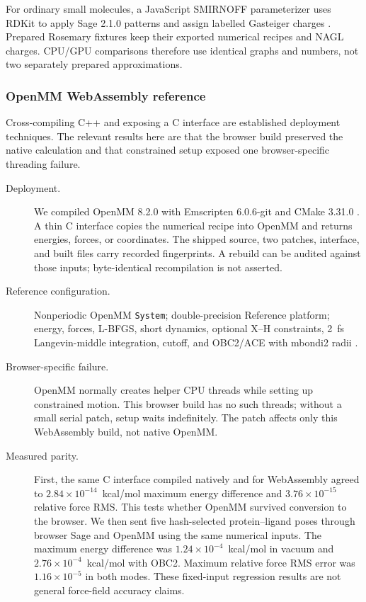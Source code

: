 For ordinary small molecules, a JavaScript SMIRNOFF parameterizer uses RDKit to
apply Sage 2.1.0 patterns and assign labelled Gasteiger charges
\cite{boothroyd2023sage,gasteiger1980charges}. Prepared Rosemary fixtures keep
their exported numerical recipes and NAGL charges. CPU/GPU comparisons therefore
use identical graphs and numbers, not two separately prepared approximations.

\subsubsection{OpenMM WebAssembly reference}

Cross-compiling C++ and exposing a C interface are established deployment
techniques. The relevant results here are that the browser build preserved the
native calculation and that constrained setup exposed one browser-specific
threading failure.

\begin{description}
  \item[Deployment.] We compiled OpenMM 8.2.0 with Emscripten 6.0.6-git and
    CMake 3.31.0 \cite{eastman2017openmm,eastman2024openmm8}. A thin C interface
    copies the numerical recipe into OpenMM and returns energies, forces, or
    coordinates. The shipped source, two patches, interface, and built files
    carry recorded fingerprints. A rebuild can be audited against those inputs;
    byte-identical recompilation is not asserted.
  \item[Reference configuration.] Nonperiodic OpenMM \texttt{System};
    double-precision Reference
    platform; energy, forces, L-BFGS, short dynamics, optional X--H constraints,
    2~fs Langevin-middle integration, cutoff, and OBC2/ACE with mbondi2
    radii \cite{onufriev2004obc2}.
  \item[Browser-specific failure.] OpenMM normally creates helper CPU threads while setting
    up constrained motion. This browser build has no such threads; without a
    small serial patch, setup waits indefinitely. The patch affects only this
    WebAssembly build, not native OpenMM.
  \item[Measured parity.] First, the same C interface compiled natively and for
    WebAssembly agreed to $2.84\times10^{-14}$~kcal/mol maximum energy difference
    and $3.76\times10^{-15}$ relative force RMS. This tests whether OpenMM
    survived conversion to the browser. We then sent five hash-selected
    protein--ligand poses
    through browser Sage and OpenMM using the same numerical inputs. The maximum
    energy difference was
    $1.24\times10^{-4}$~kcal/mol in vacuum and
    $2.76\times10^{-4}$~kcal/mol with OBC2. Maximum relative force RMS error was
    $1.16\times10^{-5}$ in both modes. These fixed-input regression results are
    not general force-field accuracy claims.
\end{description}

